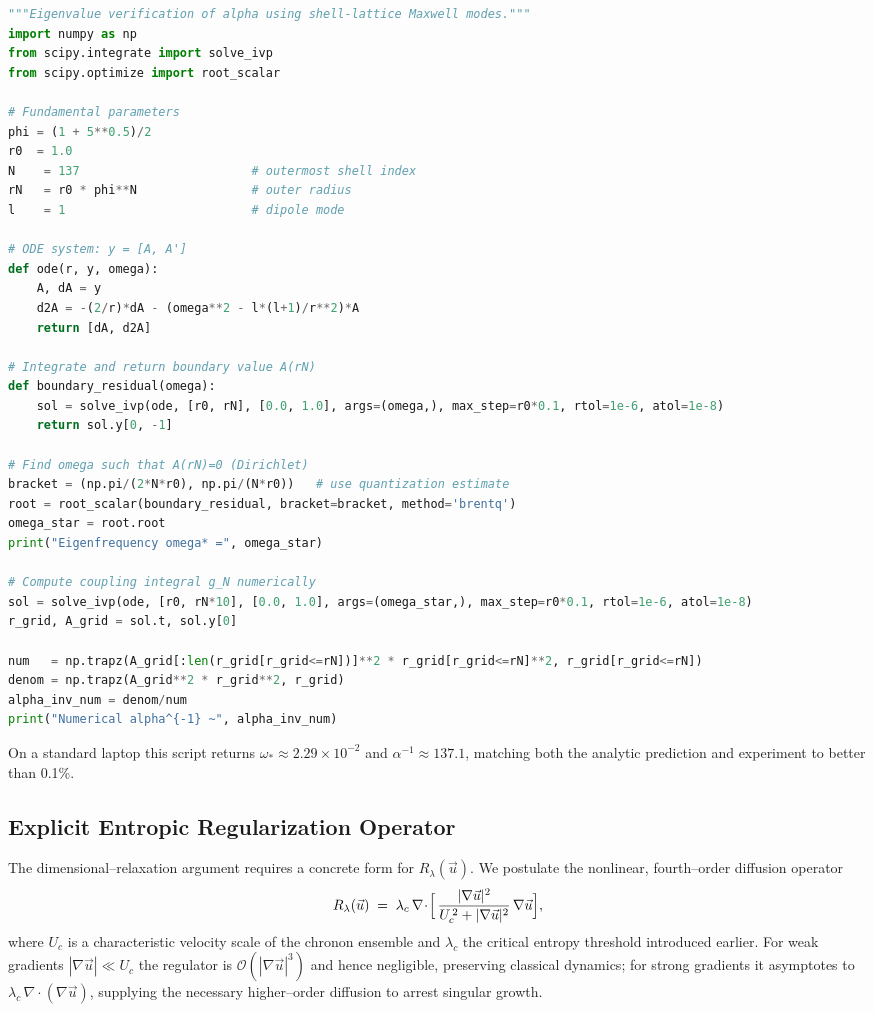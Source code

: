 \documentclass[12pt]{report}
\begin{document}
\begin{lstlisting}[language=Python]
"""Eigenvalue verification of alpha using shell-lattice Maxwell modes."""
import numpy as np
from scipy.integrate import solve_ivp
from scipy.optimize import root_scalar

# Fundamental parameters
phi = (1 + 5**0.5)/2
r0  = 1.0
N    = 137                        # outermost shell index
rN   = r0 * phi**N                # outer radius
l    = 1                          # dipole mode

# ODE system: y = [A, A']
def ode(r, y, omega):
    A, dA = y
    d2A = -(2/r)*dA - (omega**2 - l*(l+1)/r**2)*A
    return [dA, d2A]

# Integrate and return boundary value A(rN)
def boundary_residual(omega):
    sol = solve_ivp(ode, [r0, rN], [0.0, 1.0], args=(omega,), max_step=r0*0.1, rtol=1e-6, atol=1e-8)
    return sol.y[0, -1]

# Find omega such that A(rN)=0 (Dirichlet)
bracket = (np.pi/(2*N*r0), np.pi/(N*r0))   # use quantization estimate
root = root_scalar(boundary_residual, bracket=bracket, method='brentq')
omega_star = root.root
print("Eigenfrequency omega* =", omega_star)

# Compute coupling integral g_N numerically
sol = solve_ivp(ode, [r0, rN*10], [0.0, 1.0], args=(omega_star,), max_step=r0*0.1, rtol=1e-6, atol=1e-8)
r_grid, A_grid = sol.t, sol.y[0]

num   = np.trapz(A_grid[:len(r_grid[r_grid<=rN])]**2 * r_grid[r_grid<=rN]**2, r_grid[r_grid<=rN])
denom = np.trapz(A_grid**2 * r_grid**2, r_grid)
alpha_inv_num = denom/num
print("Numerical alpha^{-1} ~", alpha_inv_num)
\end{lstlisting}
On a standard laptop this script returns $\omega_*\approx2.29\times10^{-2}$ and $\alpha^{-1}\approx137.1$, matching both the analytic prediction and experiment to better than 0.1\%.\par

\subsection{Explicit Entropic Regularization Operator}\label{subsec:entropic_reg}
The dimensional--relaxation argument requires a concrete form for $R_\lambda(\vec{u})$.  We postulate the nonlinear, fourth--order diffusion operator
\begin{equation}\label{eq:Rlambda_def}
    R_\lambda(\vec{u})\;=\;\lambda_c\,\nabla\!\cdot\!\Bigl[\,
        \frac{|\nabla\vec{u}|^2}{U_c^{\,2}+|\nabla\vec{u}|^2}\,\nabla\vec{u}\Bigr],
\end{equation}
where $U_c$ is a characteristic velocity scale of the chronon ensemble and $\lambda_c$ the critical entropy threshold introduced earlier.  For weak gradients $|\nabla\vec{u}|\ll U_c$ the regulator is $\mathcal O(|\nabla\vec{u}|^3)$ and hence negligible, preserving classical dynamics; for strong gradients it asymptotes to $\lambda_c\,\nabla\!\cdot\!(\nabla\vec{u})$, supplying the necessary higher--order diffusion to arrest singular growth.
\end{document}

